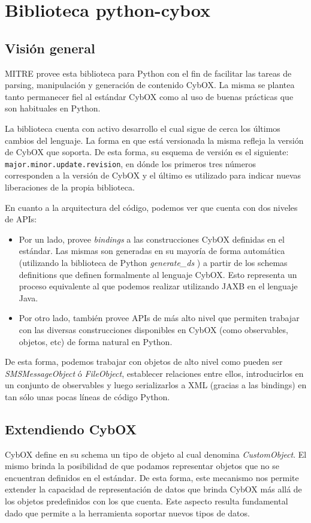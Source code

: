 \section{Biblioteca python-cybox}
\subsection{Visión general}
MITRE provee esta biblioteca \cite{python-cybox-github} para Python con el fin de facilitar las tareas de parsing, manipulación y generación de contenido CybOX. La misma se plantea tanto permanecer fiel al estándar CybOX como al uso de buenas prácticas que son habituales en Python.

La biblioteca cuenta con activo desarrollo el cual sigue de cerca los últimos cambios del lenguaje. La forma en que está versionada la misma refleja la versión de CybOX que soporta. De esta forma, su esquema de versión es el siguiente: \texttt{major.minor.update.revision}, en dónde los primeros tres números corresponden a la versión de CybOX y el último es utilizado para indicar nuevas liberaciones de la propia biblioteca.

En cuanto a la arquitectura del código, podemos ver que cuenta con dos niveles de APIs:

\begin{itemize}
\item Por un lado, provee \emph{bindings} a las construcciones CybOX definidas en el estándar. Las mismas son generadas en su mayoría de forma automática (utilizando la biblioteca de Python \emph{generate\_ds} \cite{generateDS}) a partir de los schemas definitions que definen formalmente al lenguaje CybOX. Esto representa un proceso equivalente al que podemos realizar utilizando JAXB \cite{JAXB} en el lenguaje Java.
\item Por otro lado, también provee APIs de más alto nivel que permiten trabajar con las diversas construcciones disponibles en CybOX (como observables, objetos, etc) de forma natural en Python.
\end{itemize}

De esta forma, podemos trabajar con objetos de alto nivel como pueden ser \emph{SMSMessageObject} ó \emph{FileObject}, establecer relaciones entre ellos, introducirlos en un conjunto de observables y luego serializarlos a XML (gracias a las bindings) en tan sólo unas pocas líneas de código Python.

\subsection{Extendiendo CybOX}
\label{extendiendoCybOX}
CybOX define en su schema un tipo de objeto al cual denomina \emph{CustomObject}. El mismo brinda la posibilidad de que podamos representar objetos que no se encuentran definidos en el estándar. De esta forma, este mecanismo nos permite extender la capacidad de representación de datos que brinda CybOX más allá de los objetos predefinidos con los que cuenta. Este aspecto resulta fundamental dado que permite a la herramienta soportar nuevos tipos de datos.

